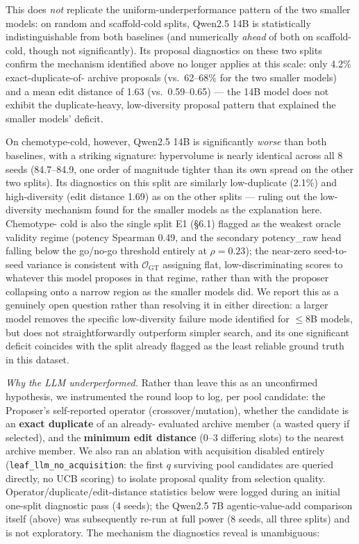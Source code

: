 \documentclass{article}
\begin{document}
This does \emph{not} replicate the uniform-underperformance pattern of the
two smaller models: on random and scaffold-cold splits, Qwen2.5 14B is
statistically indistinguishable from both baselines (and numerically
\emph{ahead} of both on scaffold-cold, though not significantly). Its
proposal diagnostics on these two splits confirm the mechanism identified
above no longer applies at this scale: only 4.2\% exact-duplicate-of-
archive proposals (vs.\ 62--68\% for the two smaller models) and a mean
edit distance of 1.63 (vs.\ 0.59--0.65) --- the 14B model does not exhibit
the duplicate-heavy, low-diversity proposal pattern that explained the
smaller models' deficit.

On chemotype-cold, however, Qwen2.5 14B is significantly \emph{worse}
than both baselines, with a striking signature: hypervolume is nearly
identical across all 8 seeds (84.7--84.9, one order of magnitude tighter
than its own spread on the other two splits). Its diagnostics on this
split are similarly low-duplicate (2.1\%) and high-diversity (edit
distance 1.69) as on the other splits --- ruling out the low-diversity
mechanism found for the smaller models as the explanation here. Chemotype-
cold is also the single split E1 (\S6.1) flagged as the weakest oracle
validity regime (potency Spearman 0.49, and the secondary potency\_raw
head falling below the go/no-go threshold entirely at $\rho=0.23$); the
near-zero seed-to-seed variance is consistent with $\mathcal{O}_{\text{GT}}$
assigning flat, low-discriminating scores to whatever this model proposes
in that regime, rather than with the proposer collapsing onto a narrow
region as the smaller models did. We report this as a genuinely open
question rather than resolving it in either direction: a larger model
removes the specific low-diversity failure mode identified for $\le$8B
models, but does not straightforwardly outperform simpler search, and its
one significant deficit coincides with the split already flagged as the
least reliable ground truth in this dataset.

\emph{Why the LLM underperformed.} Rather than leave this as an
unconfirmed hypothesis, we instrumented the round loop to log, per pool
candidate: the Proposer's self-reported operator (crossover/mutation),
whether the candidate is an \textbf{exact duplicate} of an already-
evaluated archive member (a wasted query if selected), and the
\textbf{minimum edit distance} (0--3 differing slots) to the nearest
archive member. We also ran an ablation with acquisition disabled
entirely (\texttt{leaf\_llm\_no\_acquisition}: the first $q$ surviving
pool candidates are queried directly, no UCB scoring) to isolate proposal
quality from selection quality. Operator/duplicate/edit-distance
statistics below were logged during an initial one-split diagnostic pass
(4 seeds); the Qwen2.5 7B agentic-value-add comparison itself (above) was
subsequently re-run at full power (8 seeds, all three splits) and is not
exploratory. The mechanism the diagnostics reveal is unambiguous:
\end{document}
